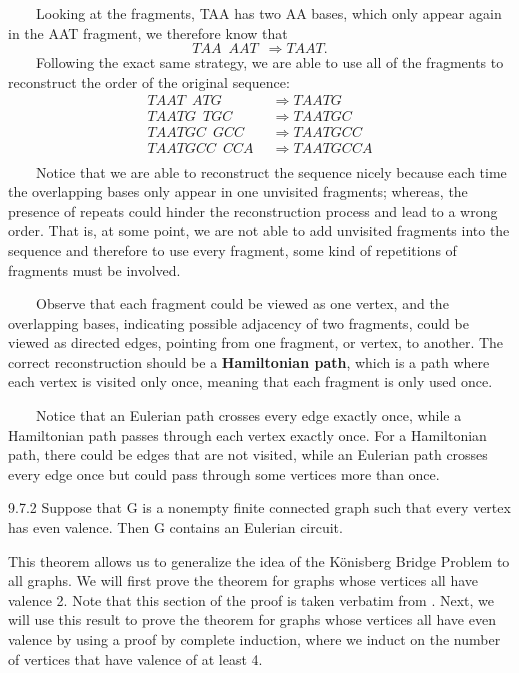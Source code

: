 	$\qquad$Looking at the fragments, TAA has two AA bases, which only appear again in the AAT fragment, we therefore know that 
				\[
				TAA\enspace AAT\enspace \Rightarrow TAAT.
				\]
	$\qquad$Following the exact same strategy, we are able to use all of the fragments to reconstruct the order of the original sequence:
				\[
				\begin{split}
				TAAT\enspace ATG\enspace &\Rightarrow TAATG \\
			     TAATG\enspace TGC\enspace &\Rightarrow TAATGC \\
			     TAATGC\enspace GCC\enspace &\Rightarrow TAATGCC \\
			     TAATGCC\enspace CCA\enspace &\Rightarrow TAATGCCA \\
				\end{split}
				\]
	$\qquad$Notice that we are able to reconstruct the sequence nicely because each time the overlapping bases only appear in one unvisited fragments; whereas, the presence of repeats could hinder the reconstruction process and lead to a wrong order. That is, at some point, we are not able to add unvisited fragments into the sequence and therefore to use every fragment, some kind of repetitions of fragments must be involved. 
	
	$\qquad$Observe that each fragment could be viewed as one vertex, and the overlapping bases, indicating possible adjacency of two fragments, could be viewed as directed edges, pointing from one fragment, or vertex, to another. The correct reconstruction should be a \textbf{Hamiltonian path}, which is a path where each vertex is visited only once, meaning that each fragment is only used once.  
	
	$\qquad$Notice that an Eulerian path crosses every edge exactly once, while a Hamiltonian path passes through each vertex exactly once. For a Hamiltonian path, there could be edges that are not visited, while an Eulerian path crosses every edge once but could pass through some vertices more than once.

\begin{customthm}{9.7.2}
    Suppose that G is a nonempty finite connected graph such that every vertex has even valence.
    Then G contains an Eulerian circuit.
\end{customthm}

    This theorem allows us to generalize the idea of the K\"{o}nisberg Bridge Problem to all graphs. We will first prove the theorem for graphs whose vertices all have valence 2. Note that this section of the proof is taken verbatim from \cite{Taylor}. Next, we will use this result to prove the theorem for graphs whose vertices all have even valence by using a proof by complete induction, where we induct on the number of vertices that have valence of at least 4. 

